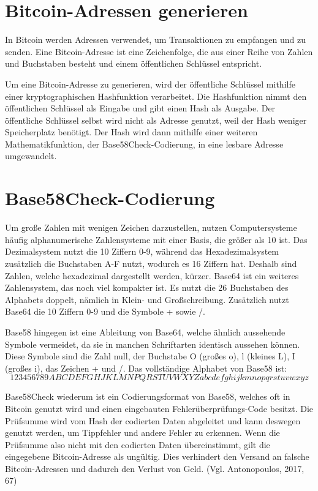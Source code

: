 \section{Bitcoin-Adressen generieren}
In Bitcoin werden Adressen verwendet, um Transaktionen zu empfangen und zu senden. Eine Bitcoin-Adresse ist eine Zeichenfolge, 
die aus einer Reihe von Zahlen und Buchstaben besteht und einem öffentlichen Schlüssel entspricht.

Um eine Bitcoin-Adresse zu generieren, wird der öffentliche Schlüssel mithilfe einer kryptographischen Hashfunktion verarbeitet.
Die Hashfunktion nimmt den öffentlichen Schlüssel als Eingabe und gibt einen Hash als Ausgabe. Der öffentliche Schlüssel selbst
wird nicht als Adresse genutzt, weil der Hash weniger Speicherplatz benötigt. Der Hash wird dann mithilfe einer weiteren 
Mathematikfunktion, der Base58Check-Codierung, in eine lesbare Adresse umgewandelt.

\section{Base58Check-Codierung}
Um große Zahlen mit wenigen Zeichen darzustellen, nutzen Computersysteme häufig alphanumerische Zahlensysteme mit einer Basis,
die größer als 10 ist. Das Dezimalsystem nutzt die 10 Ziffern 0-9, während das Hexadezimalsystem zusätzlich die Buchstaben A-F
nutzt, wodurch es 16 Ziffern hat. Deshalb sind Zahlen, welche hexadezimal dargestellt werden, kürzer. Base64 ist ein weiteres
Zahlensystem, das noch viel kompakter ist. Es nutzt die 26 Buchstaben des Alphabets doppelt, nämlich in Klein- und Großschreibung.
Zusätzlich nutzt Base64 die 10 Ziffern 0-9 und die Symbole + sowie /.

Base58 hingegen ist eine Ableitung von Base64, welche ähnlich aussehende Symbole vermeidet, da sie in manchen Schriftarten
identisch aussehen können. Diese Symbole sind die Zahl null, der Buchstabe O (großes o), l (kleines L), I (großes i), das 
Zeichen + und /. Das vollständige Alphabet von Base58 ist: \[123456789ABCDEFGHJKLMNPQRSTUVWXYZabcdefghijkmnopqrstuvwxyz\]

Base58Check wiederum ist ein Codierungsformat von Base58, welches oft in Bitcoin genutzt wird und einen eingebauten
Fehlerüberprüfungs-Code besitzt. Die Prüfsumme wird vom Hash der codierten Daten abgeleitet und kann deswegen genutzt werden, 
um Tippfehler und andere Fehler zu erkennen. Wenn die Prüfsumme also nicht mit den codierten Daten übereinstimmt, gilt die
eingegebene Bitcoin-Adresse als ungültig. Dies verhindert den Versand an falsche Bitcoin-Adressen und dadurch den Verlust
von Geld. (Vgl. Antonopoulos, 2017, 67)

